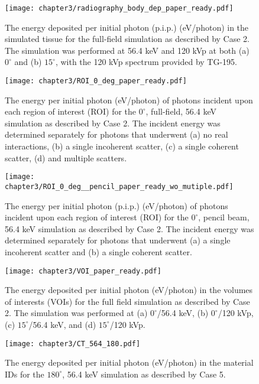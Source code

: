 \begin{figure}[H]
    \centering
	\texttt{[image: chapter3/radiography\_body\_dep\_paper\_ready.pdf]}
	\caption{The energy deposited per initial photon (p.i.p.) (eV/photon) in the simulated tissue for the full-field simulation as described by Case 2. The simulation was performed at 56.4 keV and 120 kVp at both (a) $0^\circ$ and (b) $15^\circ$, with the 120 kVp spectrum provided by TG-195.}
 	\label{fig:BDGraph}
\end{figure}


\begin{figure}[H]
    \centering
	\texttt{[image: chapter3/ROI\_0\_deg\_paper\_ready.pdf]}
	\caption{The energy per initial photon (eV/photon) of photons incident upon each region of interest (ROI) for the $0^\circ$, full-field, 56.4 keV simulation as described by Case 2. The incident energy was determined separately for photons that underwent (a) no real interactions, (b) a single incoherent scatter, (c) a single coherent scatter, (d) and multiple scatters.}
	\label{fig:ROIFFGraph}
\end{figure}

\begin{figure}[H]
    \centering
	\texttt{[image: chapter3/ROI\_0\_deg\_\_pencil\_paper\_ready\_wo\_mutiple.pdf]}
	\caption{The energy per initial photon (p.i.p.) (eV/photon) of photons incident upon each region of interest (ROI) for the $0^\circ$, pencil beam, 56.4 keV simulation as described by Case 2. The incident energy was determined separately for photons that underwent (a) a single incoherent scatter and (b) a single coherent scatter.}
	\label{fig:ROIPGraph}
\end{figure}

\begin{figure}[H]
    \centering
	\texttt{[image: chapter3/VOI\_paper\_ready.pdf]}
	\caption{The energy deposited per initial photon (eV/photon) in the volumes of interests (VOIs) for the full field simulation as described by Case 2. The simulation was performed at (a) $0^\circ$/56.4 keV, (b) $0^\circ$/120 kVp, (c) $15^\circ$/56.4 keV, and (d) $15^\circ$/120 kVp.}
	\label{fig:VOIFFGraph}
\end{figure}

\begin{figure}[H]
    \centering
	\texttt{[image: chapter3/CT\_564\_180.pdf]}
	\caption{The energy deposited per initial photon (eV/photon) in the material IDs for the $180^\circ$, 56.4 keV simulation as described by Case 5.}
	\label{fig:CTGraph}
\end{figure}

